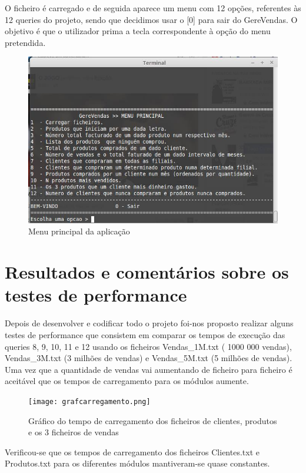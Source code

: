 O ficheiro é carregado e de seguida aparece um menu com 12 opções, referentes às 12 queries do projeto, sendo que decidimos usar o [0] para sair do GereVendas. O objetivo é que o utilizador prima a tecla correspondente à opção do menu pretendida.

\begin{figure}[h!]
	\centering
	\includegraphics[scale=0.6]{menu.png}  
	\caption{Menu principal da aplicação}  
\end{figure}


\chapter{Resultados e comentários sobre os testes de performance}
Depois de desenvolver e codificar todo o projeto foi-nos proposto realizar alguns testes de performance que consistem em comparar os tempos de execução das queries 8, 9, 10, 11 e 12 usando os ficheiros Vendas\_1M.txt ( 1000 000 vendas), Vendas\_3M.txt (3 milhões de vendas) e Vendas\_5M.txt (5 milhões de vendas).
Uma vez que a quantidade de vendas vai aumentando de ficheiro para ficheiro é aceitável que os tempos de carregamento para os módulos aumente.


\begin{figure}[h!]
	\centering
	\texttt{[image: grafcarregamento.png]}  
	\caption{Gráfico do tempo de carregamento dos ficheiros de clientes, produtos e os 3 ficheiros de vendas}  
\end{figure}

Verificou-se que os tempos de carregamento dos ficheiros Clientes.txt e Produtos.txt para os diferentes módulos mantiveram-se quase constantes. 

\paragraph{}
